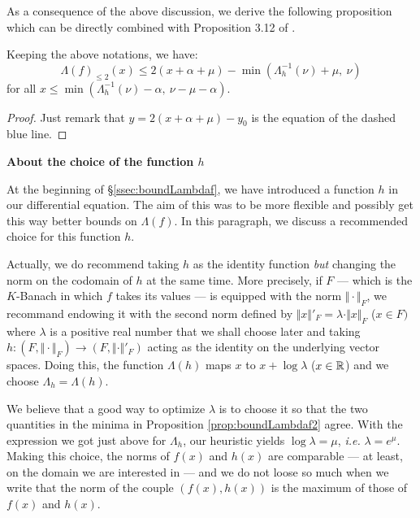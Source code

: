 \documentclass{sig-alternate}
\begin{document}
As a consequence of the above discussion, we derive the following 
proposition which can be directly combined with Proposition 3.12 of 
\cite{padicprec}.

\begin{prop}
\label{prop:boundLambdaf2}
Keeping the above notations, we have:
$$\Lambda(f)_{\leq 2} (x) \leq 2(x + \alpha + \mu) -
\min(\Lambda_h^{-1}(\nu) + \mu, \: \nu)$$
for all $x \leq \min(\Lambda_h^{-1}(\nu) - \alpha, \: \nu - \mu - \alpha)$.
\end{prop}

\begin{proof}
Just remark that $y = 2(x + \alpha + \mu) - y_0$ is the equation of 
the dashed blue line.
\end{proof}

\noindent
\textbf{About the choice of the function $h$}

\smallskip

At the beginning of \S \ref{ssec:boundLambdaf}, we have introduced a 
function $h$ in our differential equation. The aim of this was to be 
more flexible and possibly get this way better bounds on $\Lambda(f)$. 
In this paragraph, we discuss a recommended choice for this function 
$h$.

Actually, we do recommend taking $h$ as the identity function 
\emph{but} changing the norm on the codomain of $h$ at the same time.
More precisely, if $F$ --- which is the $K$-Banach in which $f$ takes
its values --- is equipped with the norm $\Vert \cdot \Vert_F$, we 
recommand endowing it with the second norm defined by
$\Vert x \Vert'_F = \lambda \cdot \Vert x \Vert_F$ ($x \in F)$
where $\lambda$ is a positive real number that we shall choose later 
and taking $h : (F, \Vert \cdot \Vert_F) \to (F, \Vert \cdot \Vert'_F)$ 
acting as the identity on the underlying vector spaces. Doing this, the 
function $\Lambda(h)$ maps $x$ to $x + \log \lambda$ ($x \in \mathbb R$) and we 
choose $\Lambda_h = \Lambda(h)$.

We believe that a good way to optimize $\lambda$ is to choose it so that 
the two quantities in the minima in Proposition \ref{prop:boundLambdaf2} 
agree. With the expression we got just above for $\Lambda_h$, our 
heuristic yields $\log \lambda = \mu$, \emph{i.e.} $\lambda = e^\mu$.
Making this choice, the norms of $f(x)$ and $h(x)$ are comparable --- 
at least, on the domain we are interested in --- and we do not loose so 
much when we write that the norm of the couple $(f(x), h(x))$ is the 
maximum of those of $f(x)$ and $h(x)$.
\end{document}
